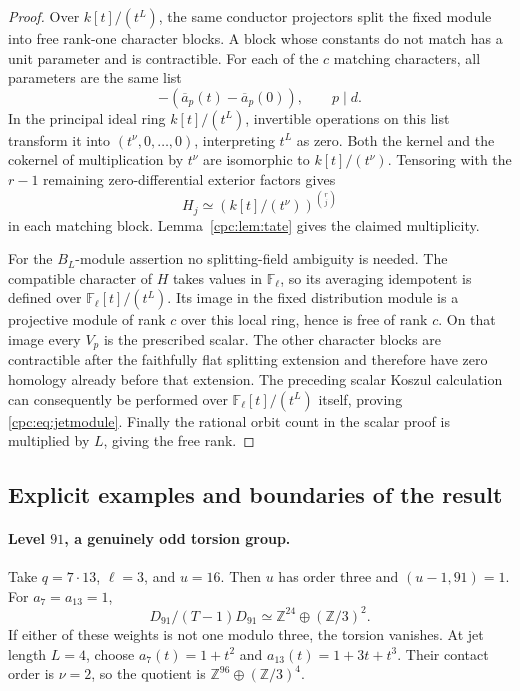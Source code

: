 \begin{proof}
Over $k[t]/(t^L)$, the same conductor projectors split the fixed
module into free rank-one character blocks. A block whose constants
do not match has a unit parameter and is contractible. For each of
the $c$ matching characters, all parameters are the same list
\[
 -(\overline a_p(t)-\overline a_p(0)),\qquad p\mid d.
\]
In the principal ideal ring $k[t]/(t^L)$, invertible operations on
this list transform it into $(t^\nu,0,\ldots,0)$, interpreting
$t^L$ as zero. Both the kernel and the cokernel of multiplication
by $t^\nu$ are isomorphic to $k[t]/(t^\nu)$. Tensoring with the
$r-1$ remaining zero-differential exterior factors gives
\[
 H_j\simeq
 \left(k[t]/(t^\nu)\right)^{\binom rj}
\]
in each matching block. Lemma~\ref{cpc:lem:tate} gives the claimed
multiplicity.

For the $B_L$-module assertion no splitting-field ambiguity is
needed. The compatible character of $H$ takes values in
$\mathbb F_\ell$, so its averaging idempotent is defined over
$\mathbb F_\ell[t]/(t^L)$. Its image in the fixed distribution
module is a projective module of rank $c$ over this local ring,
hence is free of rank $c$. On that image every $V_p$ is the
prescribed scalar. The other character blocks are contractible
after the faithfully flat splitting extension and therefore have
zero homology already before that extension. The preceding scalar
Koszul calculation can consequently be performed over
$\mathbb F_\ell[t]/(t^L)$ itself, proving
\eqref{cpc:eq:jetmodule}. Finally the rational orbit count in the
scalar proof is multiplied by $L$, giving the free rank.
\end{proof}

\subsection{Explicit examples and boundaries of the result}

\paragraph{Level $91$, a genuinely odd torsion group.}
Take $q=7\cdot13$, $\ell=3$, and $u=16$. Then $u$ has order three
and $(u-1,91)=1$. For $a_7=a_{13}=1$,
\[
 D_{91}/(T-1)D_{91}\simeq\mathbb Z^{24}\oplus(\mathbb Z/3)^2.
\]
If either of these weights is not one modulo three, the torsion
vanishes. At jet length $L=4$, choose
$a_7(t)=1+t^2$ and $a_{13}(t)=1+3t+t^3$. Their contact order is
$\nu=2$, so the quotient is
$\mathbb Z^{96}\oplus(\mathbb Z/3)^4$.

